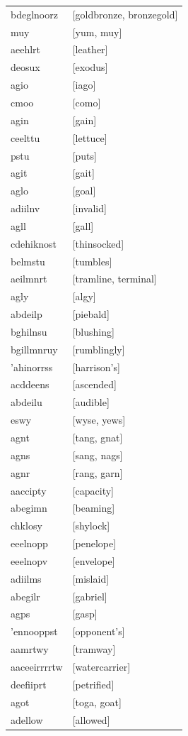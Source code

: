 \documentclass{article}
\begin{document}
\begin{tabular}{ll}
bdeglnoorz & [goldbronze, bronzegold] \\
muy & [yum, muy] \\
aeehlrt & [leather] \\
deosux & [exodus] \\
agio & [iago] \\
cmoo & [como] \\
agin & [gain] \\
ceelttu & [lettuce] \\
pstu & [puts] \\
agit & [gait] \\
aglo & [goal] \\
adiilnv & [invalid] \\
agll & [gall] \\
cdehiknost & [thinsocked] \\
belmstu & [tumbles] \\
aeilmnrt & [tramline, terminal] \\
agly & [algy] \\
abdeilp & [piebald] \\
bghilnsu & [blushing] \\
bgillmnruy & [rumblingly] \\
'ahinorrss & [harrison's] \\
acddeens & [ascended] \\
abdeilu & [audible] \\
eswy & [wyse, yews] \\
agnt & [tang, gnat] \\
agns & [sang, nags] \\
agnr & [rang, garn] \\
aaccipty & [capacity] \\
abegimn & [beaming] \\
chklosy & [shylock] \\
eeelnopp & [penelope] \\
eeelnopv & [envelope] \\
adiilms & [mislaid] \\
abegilr & [gabriel] \\
agps & [gasp] \\
'ennooppst & [opponent's] \\
aamrtwy & [tramway] \\
aaceeirrrrtw & [watercarrier] \\
deefiiprt & [petrified] \\
agot & [toga, goat] \\
adellow & [allowed] \\

\end{tabular}
\end{document}
